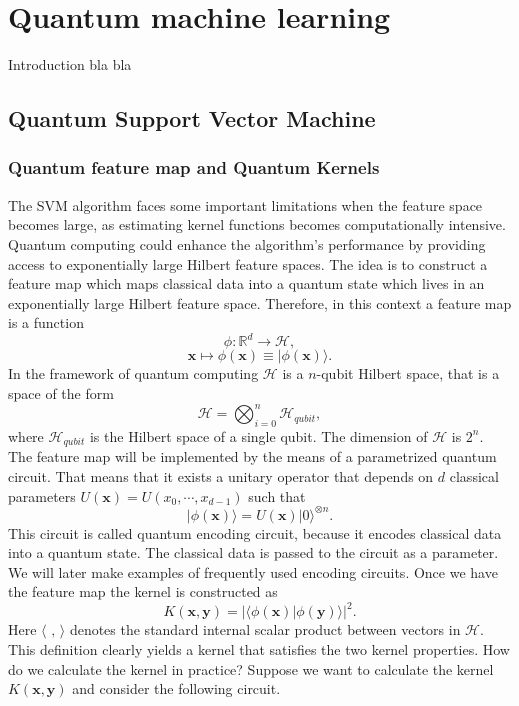 \documentclass[12pt]{article}
\begin{document}
\section{Quantum machine learning}
Introduction bla bla

\subsection{Quantum Support Vector Machine}
\subsubsection{Quantum feature map and Quantum Kernels}
The SVM algorithm faces some important limitations when the feature space becomes large, as estimating kernel functions becomes computationally intensive. Quantum computing could enhance the algorithm's performance by providing access to exponentially large Hilbert feature spaces. The idea is to construct a feature map which maps classical data into a quantum state which lives in an exponentially large Hilbert feature space. Therefore, in this context a feature map is a function 
\begin{equation}
    \phi: \mathbb{R}^d \rightarrow \mathcal{H},
\end{equation}
$$\mathbf{x}\mapsto \phi(\mathbf{x})\equiv |\phi(\mathbf{x})\rangle.$$
In the framework of quantum computing $\mathcal{H}$ is a $n$-qubit Hilbert space, that is a space of the form
\begin{equation}
    \mathcal{H}=\bigotimes_{i=0}^n \mathcal{H}_{qubit},
\end{equation}
where $\mathcal{H}_{qubit}$ is the Hilbert space of a single qubit. The dimension of $\mathcal{H}$ is $2^n$. The feature map will be implemented by the means of a parametrized quantum circuit. That means that it exists a unitary operator that depends on $d$ classical parameters $U(\mathbf{x})=U(x_0,\cdots, x_{d-1})$ such that 
\begin{equation}
    |\phi(\mathbf{x})\rangle=U(\mathbf{x})|0\rangle^{\otimes n}.
\end{equation}
This circuit is called quantum encoding circuit, because it encodes classical data into a quantum state. The classical data is passed to the circuit as a parameter. We will later make examples of frequently used encoding circuits. 
Once we have the feature map the kernel is constructed as 
\begin{equation}
    K(\mathbf{x}, \mathbf{y})=\left | \langle \phi(\mathbf{x})|\phi(\mathbf{y})\rangle \right |^2.
\end{equation}
Here $\langle\,\,, \,\rangle$ denotes the standard internal scalar product between vectors in $\mathcal{H}$. This definition clearly yields a kernel that satisfies the two kernel properties. How do we calculate the kernel in practice? Suppose we want to calculate the kernel $K(\mathbf{x}, \mathbf{y})$ and consider the following circuit. 
\end{document}

